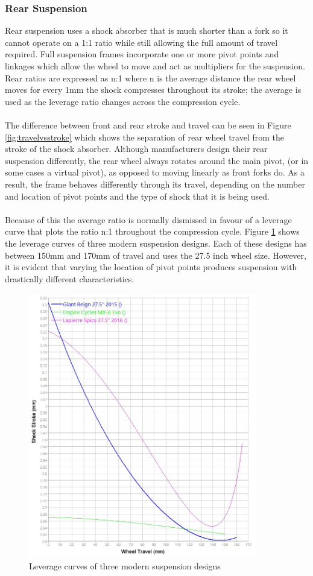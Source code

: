 	\subsubsection{Rear Suspension}\label{sec:lit_review_rear_suspension}
		Rear suspension uses a shock absorber that is much shorter than a fork so it cannot operate on a 1:1 ratio while still allowing the full amount of travel required. Full suspension frames incorporate one or more pivot points and linkages which allow the wheel to move and act as multipliers for the suspension. Rear ratios are expressed as n:1 where n is the average distance the rear wheel moves for every 1mm the shock compresses throughout its stroke; the average is used as the leverage ratio changes across the compression cycle.
		\\\\
		The difference between front and rear stroke and travel can be seen in Figure \ref{fig:travelvsstroke} which shows the separation of rear wheel travel from the stroke of the shock absorber. Although manufacturers design their rear suspension differently, the rear wheel always rotates around the main pivot, (or in some cases a virtual pivot), as opposed to moving linearly as front forks do. As a result, the frame behaves differently through its travel, depending on the number and location of pivot points and the type of shock that it is being used. 
		\\\\
		Because of this the average ratio is normally dismissed in favour of a leverage curve that plots the ratio n:1 throughout the compression cycle. Figure \ref{fig:3_bike_lev_ratio} shows the leverage curves of three modern suspension designs. Each of these designs has between 150mm and 170mm of travel and uses the 27.5 inch wheel size. However, it is evident that varying the location of pivot points produces suspension with drastically different characteristics.
		\begin{figure}[h!]
			\centering
			\includegraphics[width=10cm]{../images/3_bike_lev_ratio.jpg}
			\caption{Leverage curves of three modern suspension designs}
			\label{fig:3_bike_lev_ratio}
		\end{figure}
